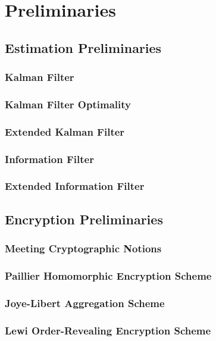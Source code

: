 
\chapter{Preliminaries}
\section{Estimation Preliminaries}
\subsection{Kalman Filter}
\subsection{Kalman Filter Optimality}
\subsection{Extended Kalman Filter}
\subsection{Information Filter}
\subsection{Extended Information Filter}
\section{Encryption Preliminaries}
\subsection{Meeting Cryptographic Notions}
\subsection{Paillier Homomorphic Encryption Scheme}
\subsection{Joye-Libert Aggregation Scheme}
\subsection{Lewi Order-Revealing Encryption Scheme}